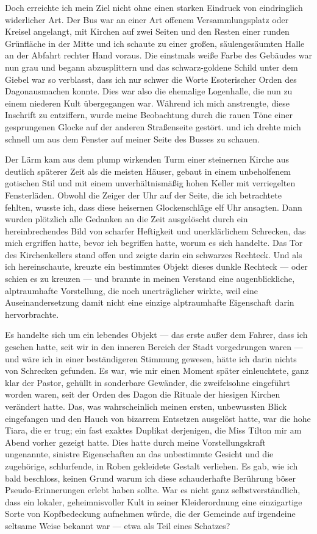 Doch erreichte ich mein Ziel nicht ohne einen starken Eindruck von eindringlich widerlicher Art. Der Bus war an einer Art offenem Versammlungsplatz oder Kreisel angelangt, mit Kirchen auf zwei Seiten und den Resten einer runden Grünfläche in der Mitte und ich schaute zu einer großen, säulengesäumten Halle an der Abfahrt rechter Hand voraus. Die einstmals weiße Farbe des Gebäudes war nun grau und begann abzusplittern und das schwarz-goldene Schild unter dem Giebel war so verblasst, dass ich nur schwer die Worte \glqq Esoterischer
Orden des Dagon\grqq ausmachen konnte. Dies war also die ehemalige Logenhalle, die nun zu einem niederen Kult übergegangen war. Während ich mich anstrengte, diese Inschrift zu entziffern, wurde meine Beobachtung durch die rauen Töne einer gesprungenen Glocke auf der anderen Straßenseite gestört. und ich drehte mich schnell um aus dem Fenster auf meiner Seite des Busses zu  schauen.

Der Lärm kam aus dem plump wirkenden Turm einer steinernen Kirche aus deutlich späterer Zeit als die meisten Häuser, gebaut in einem unbeholfenem gotischen Stil und mit einem unverhältnismäßig hohen Keller mit verriegelten Fensterläden. Obwohl die Zeiger der Uhr auf der Seite, die ich betrachtete fehlten, wusste ich, dass diese heisernen Glockenschläge elf Uhr ansagten. Dann wurden plötzlich alle Gedanken an die Zeit ausgelöscht durch ein hereinbrechendes Bild von scharfer Heftigkeit  und unerklärlichem Schrecken, das mich ergriffen hatte, bevor ich begriffen hatte, worum es sich handelte. Das Tor des Kirchenkellers stand offen und zeigte darin ein schwarzes Rechteck. Und als ich hereinschaute, kreuzte ein bestimmtes Objekt dieses dunkle Rechteck --- oder schien es zu kreuzen --- und brannte in meinen Verstand eine augenblickliche, alptraumhafte Vorstellung, die noch unerträglicher wirkte, weil eine Auseinandersetzung damit nicht eine einzige alptraumhafte Eigenschaft darin hervorbrachte.

Es handelte sich um ein lebendes Objekt --- das erste außer dem Fahrer, dass ich gesehen hatte, seit wir in den inneren Bereich der Stadt vorgedrungen waren --- und wäre ich in einer beständigeren Stimmung gewesen, hätte ich darin nichts von Schrecken gefunden. Es war, wie mir einen Moment später einleuchtete, ganz klar der Pastor, gehüllt in sonderbare Gewänder, die zweifelsohne eingeführt worden waren, seit der Orden des Dagon die Rituale der hiesigen Kirchen verändert hatte. Das, was wahrscheinlich meinen ersten, unbewussten Blick eingefangen und den Hauch von bizarrem Entsetzen ausgelöst hatte, war die hohe Tiara, die er trug; ein fast exaktes Duplikat derjenigen, die Miss Tilton mir am Abend vorher gezeigt hatte. Dies hatte durch meine Vorstellungskraft ungenannte, sinistre Eigenschaften an das unbestimmte Gesicht und die zugehörige, schlurfende, in Roben gekleidete Gestalt verliehen. Es gab, wie ich bald beschloss, keinen Grund warum ich diese schauderhafte Berührung böser Pseudo-Erinnerungen erlebt haben sollte. War es nicht ganz selbstverständlich, dass ein lokaler, geheimnisvoller Kult in seiner Kleiderordnung eine einzigartige Sorte von Kopfbedeckung aufnehmen würde, die der Gemeinde auf irgendeine seltsame Weise bekannt war --- etwa als Teil eines Schatzes?

